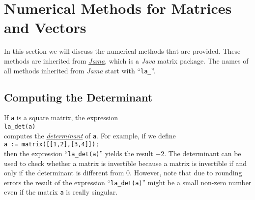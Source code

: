 \section{Numerical Methods for Matrices and Vectors}
In this section we will discuss the numerical methods that are provided.  These methods are inherited
from \href{http://math.nist.gov/javanumerics/jama/}{\textsl{Jama}}, which is a \textsl{Java} matrix
package.  The names of all methods inherited from \textsl{Jama} start with ``\texttt{la\_}''.

\subsection{Computing the Determinant}
If \texttt{a} is a square matrix, the expression 
\\[0.2cm]
\hspace*{1.3cm}
\texttt{la\_det(a)}
\\[0.2cm]
computes the \href{http://en.wikipedia.org/wiki/Determinant}{\emph{determinant}} of \texttt{a}.
For example, if we define 
\\[0.2cm]
\hspace*{1.3cm}
\texttt{a := matrix([[1,2],[3,4]]);}
\\[0.2cm]
then the expression ``\texttt{la\_det(a)}'' yields the result $-2$.  The determinant can be used to
check whether a matrix is invertible because a matrix is invertible if and only if the determinant
is different from $0$.  However, note that due to rounding errors the result of the expression 
``\texttt{la\_det(a)}''  might be a small non-zero number even if the matrix \texttt{a} is really
singular. 

